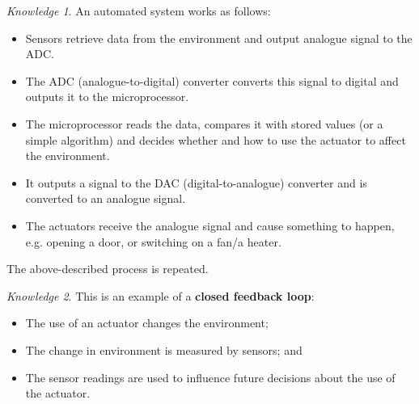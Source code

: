 \documentclass[8pt]{article}
\theoremstyle{remark}
\newtheorem{knowledge}{Knowledge}[subsection]
\begin{document}
            \begin{knowledge}
                An automated system works as follows:
                \begin{itemize}
                    \item Sensors retrieve data from the environment and output analogue signal to the ADC.
                    \item The ADC (analogue-to-digital) converter converts this signal to digital and outputs it to the microprocessor.
                    \item The microprocessor reads the data, compares it with stored values (or a simple algorithm) and decides whether and how to use the actuator to affect the environment.
                    \item It outputs a signal to the DAC (digital-to-analogue) converter and is converted to an analogue signal.
                    \item The actuators receive the analogue signal and cause something to happen, e.g. opening a door, or switching on a fan/a heater.
                \end{itemize}

                The above-described process is repeated.
            \end{knowledge}

            \begin{knowledge}
                This is an example of a \textbf{closed feedback loop}:
                \begin{itemize}
                    \item The use of an actuator changes the environment;
                    \item The change in environment is measured by sensors; and
                    \item The sensor readings are used to influence future decisions about the use of the actuator.
                \end{itemize}
            \end{knowledge}
\end{document}
